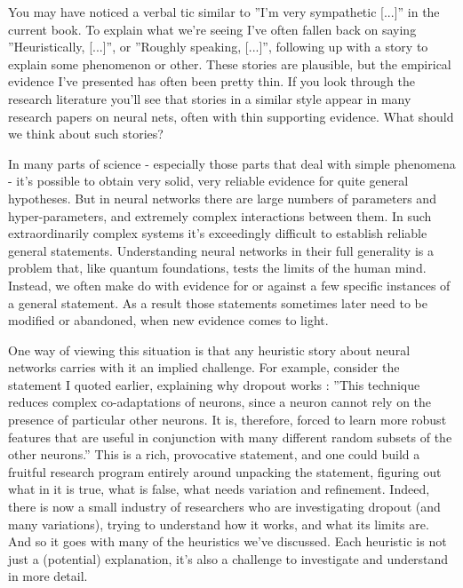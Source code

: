 You may have noticed a verbal tic similar to ''I'm very sympathetic [...]'' in the current book. To explain what we're seeing I've often fallen back on saying ''Heuristically, [...]'', or ''Roughly speaking, [...]'', following up with a story to explain some phenomenon or other. These stories are plausible, but the empirical evidence I've presented has often been pretty thin. If you look through the research literature you'll see that stories in a similar style appear in many research papers on neural nets, often with thin supporting evidence. What should we think about such stories?
    
In many parts of science - especially those parts that deal with simple phenomena - it's possible to obtain very solid, very reliable evidence for quite general hypotheses. But in neural networks there are large numbers of parameters and hyper-parameters, and extremely complex interactions between them. In such extraordinarily complex systems it's exceedingly difficult to establish reliable general statements. Understanding neural networks in their full generality is a problem that, like quantum foundations, tests the limits of the human mind. Instead, we often make do with evidence for or against a few specific instances of a general statement. As a result those statements sometimes later need to be modified or abandoned, when new evidence comes to light.
    
One way of viewing this situation is that any heuristic story about neural networks carries with it an implied challenge. For example, consider the statement I quoted earlier, explaining why dropout works \cite{NIPS2012_4824}: ''This technique reduces complex co-adaptations of neurons, since a neuron cannot rely on the presence of particular other neurons. It is, therefore, forced to learn more robust features that are useful in conjunction with many different random subsets of the other neurons.'' This is a rich, provocative statement, and one could build a fruitful research program entirely around unpacking the statement, figuring out what in it is true, what is false, what needs variation and refinement. Indeed, there is now a small industry of researchers who are investigating dropout (and many variations), trying to understand how it works, and what its limits are. And so it goes with many of the heuristics we've discussed. Each heuristic is not just a (potential) explanation, it's also a challenge to investigate and understand in more detail.
    
